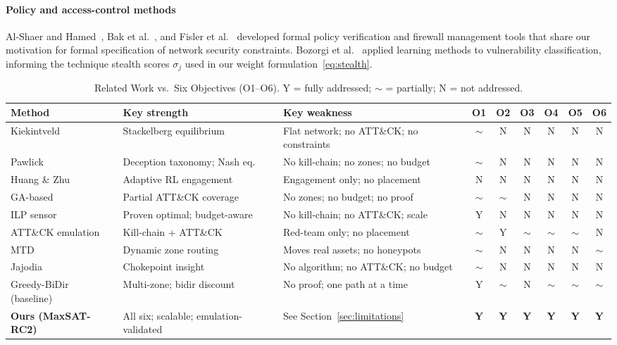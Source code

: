 \documentclass[journal]{IEEEtran}
\begin{document}
\paragraph{Policy and access-control methods}
Al-Shaer and Hamed~\cite{alshaer2004}, Bak et al.~\cite{bak2009}, and
Fisler et al.~\cite{fisler2005} developed formal policy verification
and firewall management tools that share our motivation for formal
specification of network security constraints. Bozorgi et
al.~\cite{bozorgi2010} applied learning methods to vulnerability
classification, informing the technique stealth scores $\sigma_j$ used
in our weight formulation~\eqref{eq:stealth}.

\begin{table}[t]
\caption{Related Work vs.\ Six Objectives (O1--O6).
  Y = fully addressed; $\sim$ = partially; N = not addressed.}
\label{tab:related_obj}
\centering
\renewcommand{\arraystretch}{1.2}
\begin{tabular}{lp{3.1cm}p{3.5cm}cccccc}
\toprule
Method & Key strength & Key weakness & O1 & O2 & O3 & O4 & O5 & O6 \\
\midrule
Kiekintveld~\cite{kiekintveld2015} &
  Stackelberg equilibrium &
  Flat network; no ATT\&CK; no constraints &
  $\sim$ & N & N & N & N & N \\
Pawlick~\cite{pawlick2019} &
  Deception taxonomy; Nash eq. &
  No kill-chain; no zones; no budget &
  $\sim$ & N & N & N & N & N \\
Huang \& Zhu~\cite{huang2019} &
  Adaptive RL engagement &
  Engagement only; no placement &
  N & N & N & N & N & N \\
GA-based~\cite{hemberg2018} &
  Partial ATT\&CK coverage &
  No zones; no budget; no proof &
  $\sim$ & $\sim$ & N & N & N & N \\
ILP sensor~\cite{saha2015} &
  Proven optimal; budget-aware &
  No kill-chain; no ATT\&CK; scale &
  Y & N & N & N & N & N \\
ATT\&CK emulation~\cite{applebaum2016} &
  Kill-chain + ATT\&CK &
  Red-team only; no placement &
  $\sim$ & Y & $\sim$ & $\sim$ & $\sim$ & N \\
MTD~\cite{zhu2013} &
  Dynamic zone routing &
  Moves real assets; no honeypots &
  $\sim$ & N & N & N & N & $\sim$ \\
Jajodia~\cite{jajodia2005} &
  Chokepoint insight &
  No algorithm; no ATT\&CK; no budget &
  $\sim$ & N & N & N & N & N \\
Greedy-BiDir (baseline) &
  Multi-zone; bidir discount &
  No proof; one path at a time &
  Y & $\sim$ & N & $\sim$ & $\sim$ & $\sim$ \\
\midrule
\textbf{Ours (MaxSAT-RC2)} &
  All six; scalable; emulation-validated &
  See Section~\ref{sec:limitations} &
  \textbf{Y} & \textbf{Y} & \textbf{Y} & \textbf{Y} & \textbf{Y} & \textbf{Y} \\
\bottomrule
\end{tabular}
\end{table}
\end{document}
